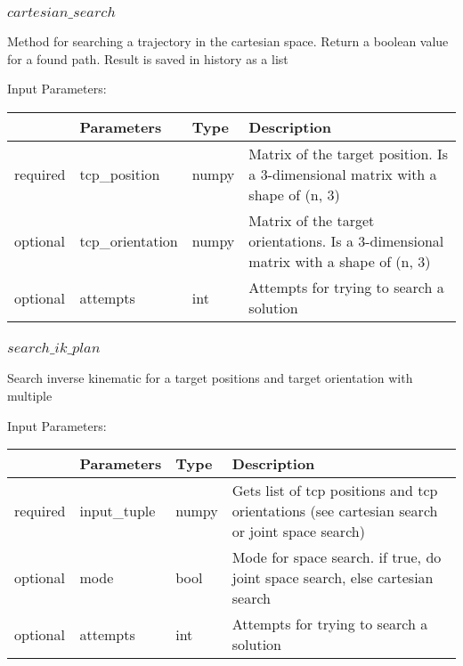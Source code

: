 \documentclass[
	ngerman,
	accentcolor=9c,%
	type=intern,
	marginpar=false
	]{tudapub}
\begin{document}
\subsubsection{$cartesian\_search$}
\noindent Method for searching a trajectory in the cartesian space. Return a boolean value for a found path. Result is saved in history as a list

\vspace{0.5cm}
\noindent Input Parameters:
\vspace{0.5cm}

\begin{tabular}{|p{}|p{}|p{}| p{}|}
\hline
 & \textbf{Parameters} & \textbf{Type} & \textbf{Description} \\
\hline
required & tcp\_position & numpy & Matrix of the target position. Is a 3-dimensional matrix with a shape of (n, 3)\\
\hline
optional & tcp\_orientation & numpy & Matrix of the target orientations. Is a 3-dimensional matrix with a shape of (n, 3)\\
\hline
optional & attempts & int & Attempts for trying to search a solution\\
\hline
\end{tabular}
\vspace{1cm}

\subsubsection{$search\_ik\_plan$}
\noindent Search inverse kinematic for a target positions and target orientation with multiple

\vspace{0.5cm}
\noindent Input Parameters:
\vspace{0.5cm}

\begin{tabular}{|p{}|p{}|p{}| p{}|}
\hline
 & \textbf{Parameters} & \textbf{Type} & \textbf{Description} \\
\hline
required & input\_tuple & numpy & Gets list of tcp positions and tcp orientations (see cartesian search or joint space search)\\
\hline
optional & mode & bool & Mode for space search. if true, do joint space search, else cartesian search\\
\hline
optional & attempts & int & Attempts for trying to search a solution\\
\hline
\end{tabular}
\vspace{1cm}
\end{document}
